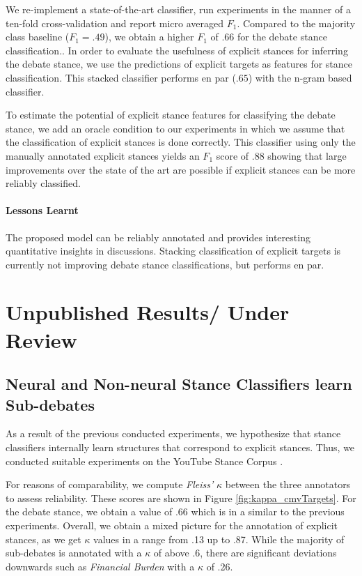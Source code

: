 \documentclass[11pt]{article}
\begin{document}
We re-implement a state-of-the-art classifier, run experiments in the manner of a ten-fold cross-validation and report micro averaged $F_1$.
Compared to the majority class baseline ($F_1=.49$), we obtain a higher $F_1$ of $.66$ for the debate stance classification..
In order to evaluate the usefulness of explicit stances for inferring the debate stance, we use the predictions of explicit targets as features for stance classification.
This stacked classifier performs en par ($.65$) with the n-gram based classifier.

To estimate the potential of explicit stance features for classifying the debate stance, we add an oracle condition to our experiments in which we assume that the classification of explicit stances is done correctly.
This classifier using only the manually annotated explicit stances yields an $F_1$ score of $.88$ showing that large improvements over the state of the art are possible if explicit stances can be more reliably classified.

\paragraph{Lessons Learnt}
The proposed model can be reliably annotated and provides interesting quantitative insights in discussions. 
Stacking classification of explicit targets is currently not improving debate stance classifications, but performs en par. 

\section{Unpublished Results/ Under Review}

\subsection{Neural and Non-neural Stance Classifiers learn Sub-debates \cite{wojatzki2017youtube} }

As a result of the previous conducted experiments, we hypothesize that stance classifiers internally learn structures that correspond to explicit stances. 
Thus, we conducted suitable experiments on the YouTube Stance Corpus \cite{wojatzki2017youtube}.

For reasons of comparability, we compute \textit{Fleiss'} $\kappa$  between the three annotators to assess reliability.
These scores are shown in Figure \ref{fig:kappa_cmvTargets}.
For the debate stance, we obtain a value of .66 which is in a similar to the previous experiments.
Overall, we obtain a mixed picture for the annotation of explicit stances, as we get $\kappa$ values in a range from .13 up to .87. 
While the majority of sub-debates is annotated with a $\kappa$ of above .6, there are significant deviations downwards such as \textit{Financial Burden} with a $\kappa$ of .26.
\end{document}
